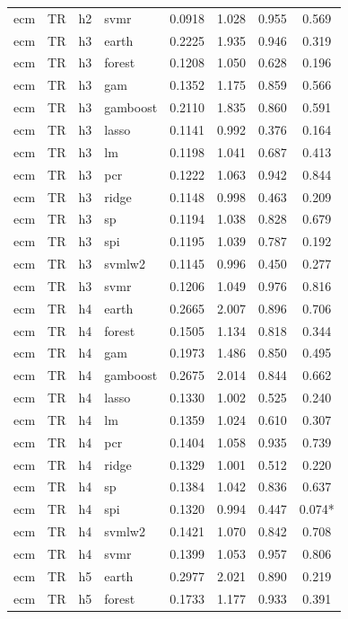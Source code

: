 \begin{ThreePartTable}
\begin{longtable}[t]{llclcccc}
ecm & TR & h2 & svmr & 0.0918 & 1.028 & 0.955 & 0.569\\
\addlinespace
ecm & TR & h3 & earth & 0.2225 & 1.935 & 0.946 & 0.319\\
ecm & TR & h3 & forest & 0.1208 & 1.050 & 0.628 & 0.196\\
ecm & TR & h3 & gam & 0.1352 & 1.175 & 0.859 & 0.566\\
ecm & TR & h3 & gamboost & 0.2110 & 1.835 & 0.860 & 0.591\\
ecm & TR & h3 & lasso & 0.1141 & 0.992 & 0.376 & 0.164\\
ecm & TR & h3 & lm & 0.1198 & 1.041 & 0.687 & 0.413\\
ecm & TR & h3 & pcr & 0.1222 & 1.063 & 0.942 & 0.844\\
ecm & TR & h3 & ridge & 0.1148 & 0.998 & 0.463 & 0.209\\
ecm & TR & h3 & sp & 0.1194 & 1.038 & 0.828 & 0.679\\
ecm & TR & h3 & spi & 0.1195 & 1.039 & 0.787 & 0.192\\
ecm & TR & h3 & svmlw2 & 0.1145 & 0.996 & 0.450 & 0.277\\
ecm & TR & h3 & svmr & 0.1206 & 1.049 & 0.976 & 0.816\\
\addlinespace
ecm & TR & h4 & earth & 0.2665 & 2.007 & 0.896 & 0.706\\
ecm & TR & h4 & forest & 0.1505 & 1.134 & 0.818 & 0.344\\
ecm & TR & h4 & gam & 0.1973 & 1.486 & 0.850 & 0.495\\
ecm & TR & h4 & gamboost & 0.2675 & 2.014 & 0.844 & 0.662\\
ecm & TR & h4 & lasso & 0.1330 & 1.002 & 0.525 & 0.240\\
ecm & TR & h4 & lm & 0.1359 & 1.024 & 0.610 & 0.307\\
ecm & TR & h4 & pcr & 0.1404 & 1.058 & 0.935 & 0.739\\
ecm & TR & h4 & ridge & 0.1329 & 1.001 & 0.512 & 0.220\\
ecm & TR & h4 & sp & 0.1384 & 1.042 & 0.836 & 0.637\\
ecm & TR & h4 & spi & 0.1320 & 0.994 & 0.447 & 0.074*\\
ecm & TR & h4 & svmlw2 & 0.1421 & 1.070 & 0.842 & 0.708\\
ecm & TR & h4 & svmr & 0.1399 & 1.053 & 0.957 & 0.806\\
\addlinespace
ecm & TR & h5 & earth & 0.2977 & 2.021 & 0.890 & 0.219\\
ecm & TR & h5 & forest & 0.1733 & 1.177 & 0.933 & 0.391\\

\end{longtable}
\end{ThreePartTable}

